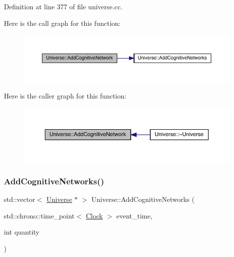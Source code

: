 Definition at line 377 of file universe.\+cc.

Here is the call graph for this function\+:
\nopagebreak
\begin{figure}[H]
\begin{center}
\leavevmode
\includegraphics[width=350pt]{class_universe_ab682307c963836cd81b35b5604bd7064_cgraph}
\end{center}
\end{figure}
Here is the caller graph for this function\+:
\nopagebreak
\begin{figure}[H]
\begin{center}
\leavevmode
\includegraphics[width=350pt]{class_universe_ab682307c963836cd81b35b5604bd7064_icgraph}
\end{center}
\end{figure}
\mbox{\label{class_universe_a5199f6c27b1a97c8b8c9847b8be686cf}} 
\subsubsection{\texorpdfstring{Add\+Cognitive\+Networks()}{AddCognitiveNetworks()}}
{\footnotesize\ttfamily std\+::vector$<$ \hyperlink{class_universe}{Universe} $\ast$ $>$ Universe\+::\+Add\+Cognitive\+Networks (\begin{DoxyParamCaption}\item[{std\+::chrono\+::time\+\_\+point$<$ \hyperlink{universe_8h_a0ef8d951d1ca5ab3cfaf7ab4c7a6fd80}{Clock} $>$}]{event\+\_\+time,  }\item[{int}]{quantity }\end{DoxyParamCaption})}



